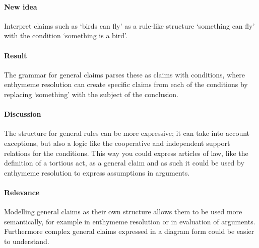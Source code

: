 \documentclass{article}
\begin{document}
\paragraph{New idea} Interpret claims such as `birds can fly' as a rule-like structure `something can fly' with the condition `something is a bird'.
\paragraph{Result} The grammar for general claims parses these as claims with conditions, where enthymeme resolution can create specific claims from each of the conditions by replacing `something' with the subject of the conclusion.
\paragraph{Discussion} The structure for general rules can be more expressive; it can take into account exceptions, but also a logic like the cooperative and independent support relations for the conditions. This way you could express articles of law, like the definition of a tortious act, as a general claim and as such it could be used by enthymeme resolution to express assumptions in arguments.
\paragraph{Relevance} Modelling general claims as their own structure allows them to be used more semantically, for example in enthymeme resolution or in evaluation of arguments. Furthermore complex general claims expressed in a diagram form could be easier to understand.



\end{document}
